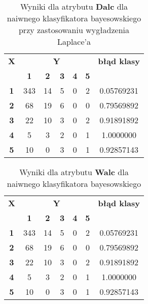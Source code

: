 \begin{table}[h]
\caption{Wyniki dla atrybutu \textbf{Dalc} dla naiwnego klasyfikatora bayesowskiego przy zastosowaniu wygładzenia Laplace'a}
\centering
\begin{tabular}{|c|c|c|c|c|c|c|}
\hline
\multirow{}{}{\textbf{X}} & \multicolumn{5}{c|}{\textbf{Y}}                                & \multirow{}{}{\textbf{błąd klasy}} \\ \cline{2-6}
                            & \textbf{1} & \textbf{2} & \textbf{3} & \textbf{4} & \textbf{5} &                                      \\ \hline
\textbf{1}                  & 343        & 14         & 5          & 0          & 2          & 0.05769231                           \\ \hline
\textbf{2}                  & 68         & 19         & 6          & 0          & 0          & 0.79569892                           \\ \hline
\textbf{3}                  & 22         & 10         & 3          & 0          & 2          & 0.91891892                           \\ \hline
\textbf{4}                  & 5          & 3          & 2          & 0          & 1          & 1.0000000                            \\ \hline
\textbf{5}                  & 10         & 0          & 3          & 0          & 1          & 0.92857143                           \\ \hline
\end{tabular}
\end{table}
\begin{table}[h]
\caption{Wyniki dla atrybutu \textbf{Walc} dla naiwnego klasyfikatora bayesowskiego}
\centering
\begin{tabular}{|c|c|c|c|c|c|c|}
\hline
\multirow{}{}{\textbf{X}} & \multicolumn{5}{c|}{\textbf{Y}}                                & \multirow{}{}{\textbf{błąd klasy}} \\ \cline{2-6}
                            & \textbf{1} & \textbf{2} & \textbf{3} & \textbf{4} & \textbf{5} &                                      \\ \hline
\textbf{1}                  & 343        & 14         & 5          & 0          & 2          & 0.05769231                           \\ \hline
\textbf{2}                  & 68         & 19         & 6          & 0          & 0          & 0.79569892                           \\ \hline
\textbf{3}                  & 22         & 10         & 3          & 0          & 2          & 0.91891892                           \\ \hline
\textbf{4}                  & 5          & 3          & 2          & 0          & 1          & 1.0000000                            \\ \hline
\textbf{5}                  & 10         & 0          & 3          & 0          & 1          & 0.92857143                           \\ \hline
\end{tabular}
\end{table}

